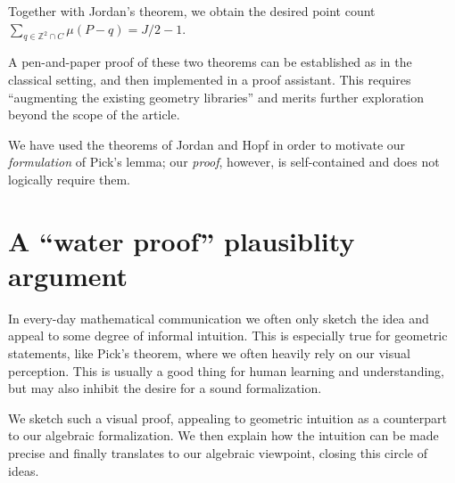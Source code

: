 \documentclass[a4paper]{amsart}
\numberwithin{equation}{section}
\theoremstyle{plain}
\theoremstyle{definition}
\newcommand{\Z}{\mathbb{Z}}
\begin{document}
Together with Jordan's theorem, we obtain the desired
point count $\sum_{q \in \Z^2 \cap C} \mu(P-q) = J/2 - 1$.

A pen-and-paper proof of these two theorems
can be established as in the classical setting,
and then implemented in a proof assistant. %
This requires ``augmenting the existing geometry libraries'' \cite{Binder:Kosaian:2024}
and merits further exploration beyond the scope of the article.

We have used the theorems of Jordan and Hopf in order
to motivate our \emph{formulation} of Pick's lemma;
our \emph{proof}, however, is self-contained and
does not logically require them.


\setcounter{section}{22}
\section{A ``water proof'' plausiblity argument}

In every-day mathematical communication we often only sketch
the idea and appeal to some degree of informal intuition.
This is especially true for geometric statements,
like Pick's theorem, where we often heavily rely on our visual perception.
This is usually a good thing for human learning and understanding,
but may also inhibit the desire for a sound formalization.

We sketch such a visual proof, appealing to geometric intuition
as a counterpart to our algebraic formalization.
We then explain how the intuition can be made precise
and finally translates to our algebraic viewpoint,
closing this circle of ideas.
\end{document}
